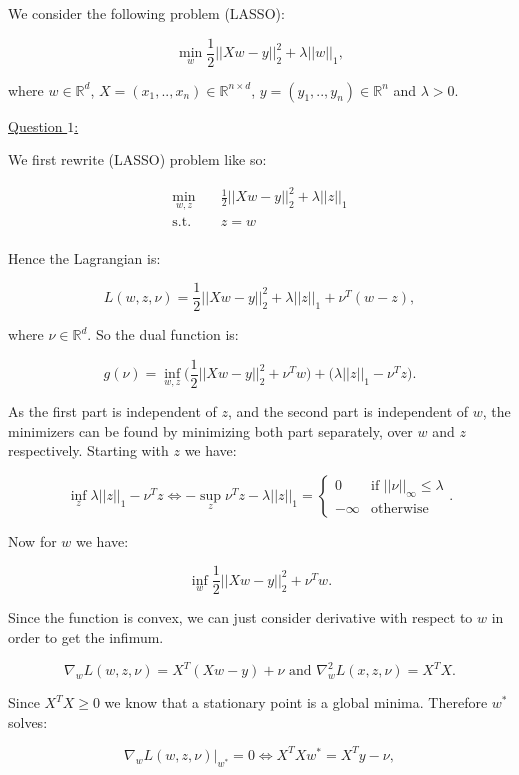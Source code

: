 \documentclass[a4paper, 12pt]{article}
\begin{document}
	
	We consider the following problem (LASSO):
	
	$$\min_w \frac{1}{2}||Xw - y||_2^2 + \lambda||w||_1,$$
	
	where $w\in \mathbb{R}^d$, $X=(x_1, .., x_n) \in \mathbb{R}^{n \times d}$, $y=(y_1, .., y_n) \in \mathbb{R}^n$ and $\lambda > 0$.
	
	\bigbreak
	
	\underline{Question $1$:}
	
	\smallbreak
	
	We first rewrite (LASSO) problem like so:
	
	$$\begin{aligned}
	\min_{w,z} \quad & \frac{1}{2}||Xw - y||_2^2 + \lambda||z||_1\\
	\textrm{s.t.} \quad & z = w\\
	\end{aligned}$$
	
	Hence the Lagrangian is:
	
	$$ L(w,z,\nu) = \frac{1}{2}||Xw - y||_2^2 + \lambda||z||_1 + \nu^T(w-z),$$
	
	where $\nu \in \mathbb{R}^d.$ So the dual function is:
	
	$$ g(\nu) = \inf_{w,z} \bigg( \frac{1}{2}||Xw - y||_2^2 + \nu^Tw\bigg) + \bigg(\lambda||z||_1 -\nu^Tz\bigg).$$
	
	As the first part is independent of $z$, and the second part is independent of $w$, the minimizers can be found by minimizing both part separately, over $w$ and $z$ respectively. Starting with $z$ we have:
	
	$$ \inf_{z} \lambda||z||_1 -\nu^Tz \Longleftrightarrow -\sup_{z} \nu^Tz - \lambda||z||_1 = \begin{cases}
	 0 & \mbox{if } ||\nu||_{\infty} \leq \lambda \\
	 -\infty & \text{otherwise}
	\end{cases}.$$
	
	Now for $w$ we have:
	
	$$ \inf_w  \frac{1}{2}||Xw - y||_2^2 + \nu^Tw.$$
	
	Since the function is convex, we can just consider derivative with respect to $w$ in order to get the infimum.
	
	$$ \nabla_w L(w,z,\nu) = X^T(Xw-y) + \nu \text{ and } \nabla_w^2 L(x,z,\nu) = X^TX.$$
	
	Since $X^TX \geq 0$ we know that a stationary point is a global minima. Therefore $w^*$ solves:
	
	$$  \nabla_w L(w,z,\nu)\rvert_{w^*} = 0 \Longleftrightarrow X^TXw^* = X^Ty - \nu,$$
	
\end{document}
